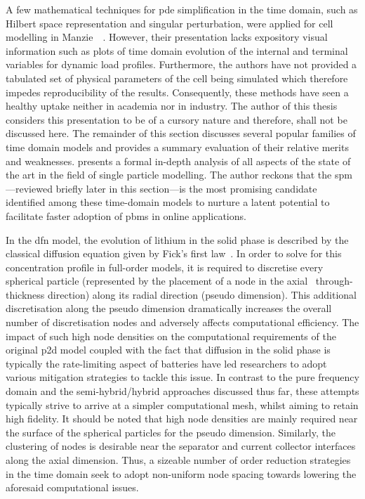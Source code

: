 A few mathematical  techniques for \gls{pde} simplification in  the time domain,
such as Hilbert space representation and singular perturbation, were applied for
cell  modelling in  Manzie~\etal~\cite{Manzie2015}. However,  their presentation
lacks expository  visual information such as  plots of time domain  evolution of
the internal and terminal variables  for dynamic load profiles. Furthermore, the
authors  have  not provided  a  tabulated  set  of  physical parameters  of  the
cell being  simulated which  therefore impedes  reproducibility of  the results.
Consequently, these methods  have seen a healthy uptake neither  in academia nor
in industry. The  author of this thesis  considers this presentation to  be of a
cursory  nature  and therefore,  shall  not  be  discussed here.  The  remainder
of  this  section discusses  several  popular  families  of time  domain  models
and  provides a  summary evaluation  of  their relative  merits and  weaknesses.
 presents a formal in-depth  analysis of all aspects of the
state of the art  in the field of single particle  modelling. The author reckons
that  the  \gls{spm}---reviewed briefly  later  in  this section---is  the  most
promising  candidate identified  among  these time-domain  models  to nurture  a
latent  potential  to  facilitate  faster  adoption  of  \glspl{pbm}  in  online
applications.



In the \gls{dfn} model, the evolution of lithium in the solid phase is described
by the classical  diffusion equation given by  Fick's first law~\cite{Fick1995}.
In order  to solve for  this concentration profile  in full-order models,  it is
required to discretise every spherical particle (represented by the placement of
a  node  in  the  axial  \ie~through-thickness  direction)  along  its  radial
direction (pseudo  dimension). This  additional discretisation along  the pseudo
dimension dramatically increases the overall  number of discretisation nodes and
adversely  affects  computational  efficiency.  The impact  of  such  high  node
densities  on the  computational requirements  of the  original \gls{p2d}  model
coupled  with the  fact  that diffusion  in  the solid  phase  is typically  the
rate-limiting  aspect  of  batteries  have  led  researchers  to  adopt  various
mitigation strategies  to tackle this issue.  In contrast to the  pure frequency
domain and the semi-hybrid/hybrid approaches  discussed thus far, these attempts
typically strive  to arrive at  a simpler  computational mesh, whilst  aiming to
retain high  fidelity. It should  be noted that  high node densities  are mainly
required near the  surface of the spherical particles for  the pseudo dimension.
Similarly, the clustering  of nodes is desirable near the  separator and current
collector interfaces along the axial dimension. Thus, a sizeable number  of order reduction strategies
in the time  domain seek to adopt non-uniform node  spacing towards lowering the
aforesaid computational issues.

